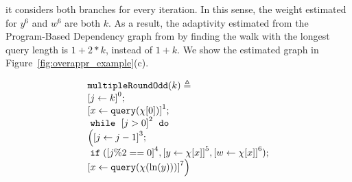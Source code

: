\begin{example}
it considers both branches for every iteration. 
In this sense, the weight estimated for $y^6$ and $w^6$ are both 
$k$.
As a result, the adaptivity estimated from the Program-Based Dependency graph from {\THESYSTEM} by finding the walk with the longest query length is $1 + 2 * k$, instead of $1 + k$. We show the estimated graph in Figure~\ref{fig:overappr_example}(c). 
%
{ \small
\begin{figure}
\centering
    \begin{subfigure}{0.45\textwidth}
\centering
\[
    \begin{array}{l}
        \kw{multipleRoundOdd}(k) \triangleq \\
        \clabel{ \assign{j}{k}}^{0} ; \\
        \clabel{ \assign{x}{\query(\chi[0])} }^{1} ; \\
            \ewhile ~ \clabel{j > 0}^{2} ~ \edo ~ \\
            \Big(
             \clabel{\assign{j}{j-1}}^{3} ;\\
             \eif(\clabel{j \% 2 == 0}^{4}, 
             \clabel{\assign{y}{\chi[x]}}^{5}, 
             \clabel{\assign{w}{\chi[x]}}^{6});\\                            
             \clabel{\assign{x}{\query(\chi(\ln(y)))} }^{7} \Big)
        \end{array}
    \]
 \caption{}
    \end{subfigure}
%
\begin{subfigure}{.45\textwidth}
    \begin{centering}
\end{centering}
\end{subfigure}
\end{figure}}
\end{example}
